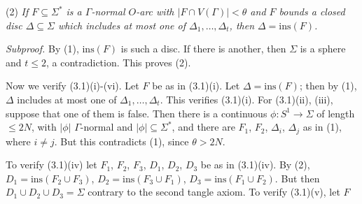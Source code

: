 \hspace*{12pt}(2) \textit{If $F \subseteq \Sigma^*$ is a $\Gamma$-normal $O$-arc with $|F \cap V(\Gamma)| < \theta$ and $F$ bounds a closed disc $\Delta \subseteq \Sigma$ which includes at most one of $\Delta_1, \dots, \Delta_t$, then $\Delta = \text{ins}(F)$.}

\textit{Subproof.} By (1), $\text{ins}(F)$ is such a disc. If there is another, then $\Sigma$ is a sphere and $t \le 2$, a contradiction. This proves (2).

Now we verify (3.1)(i)-(vi). Let $F$ be as in (3.1)(i). Let $\Delta = \text{ins}(F)$; then by (1), $\Delta$ includes at most one of $\Delta_1, \dots, \Delta_t$. This verifies (3.1)(i). For (3.1)(ii), (iii), suppose that one of them is false. Then there is a continuous $\phi \colon S^1 \to \Sigma$ of length $\le 2N$, with $|\phi|$ $\Gamma$-normal and $|\phi| \subseteq \Sigma^*$, and there are $F_1$, $F_2$, $\Delta_i$, $\Delta_j$ as in (1), where $i \ne j$. But this contradicts (1), since $\theta > 2N$.

To verify (3.1)(iv) let $F_1$, $F_2$, $F_3$, $D_1$, $D_2$, $D_3$ be as in (3.1)(iv). By (2), $D_1 = \text{ins}(F_2 \cup F_3)$, $D_2 = \text{ins}(F_3 \cup F_1)$, $D_3 = \text{ins}(F_1 \cup F_2)$. But then $D_1 \cup D_2 \cup D_3 = \Sigma$ contrary to the second tangle axiom. To verify (3.1)(v), let $F$
